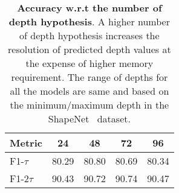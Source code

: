 \begin{table}[ht]
\begin{center}
\footnotesize
\begin{tabular}{l | c c c c}
    \hline
    Metric & 24 & 48 & 72 & 96  \\
    \hline
    F1-$\tau$  & 80.29 & 80.80 & 80.69 & 80.34   \\
    F1-$2\tau$ & 90.43 & 90.72 & 90.74 & 90.47   \\
    \hline
\end{tabular}
\end{center}
\caption{
    \textbf{Accuracy w.r.t the number of depth hypothesis}. A higher number of depth hypothesis increases the resolution of predicted depth values at the expense of higher memory requirement. The range of depths for all the models are same and based on the minimum/maximum depth in the ShapeNet~\cite{chang2015shapenet} dataset.
}
\label{table:depth_resolution}
\end{table}
